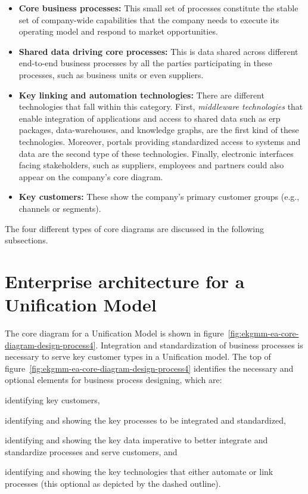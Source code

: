 \begin{itemize}
    \item \textbf{Core business processes:} This small set of processes constitute the stable set of company-wide
    capabilities that the company needs to execute its operating model and respond to market opportunities.
    \item \textbf{Shared data driving core processes:} This is data shared across different end-to-end
    business processes by all the parties participating in these processes, such as business units or even suppliers.
    \item \textbf{Key linking and automation technologies:} There are different technologies that fall within
    this category.
    First, \textit{middleware technologies} that enable integration of applications and access to shared data
    such as \gls{erp} packages, data-warehouses, and knowledge graphs, are the first kind of these technologies.
    Moreover, portals providing standardized access to systems and data are the second type of
    these technologies.
    Finally, electronic interfaces facing stakeholders, such as suppliers, employees and partners
    could also appear on the company’s core diagram.
    \item \textbf{Key customers:} These show the company's primary customer groups (e.g., channels or segments).
\end{itemize}

The four different types of core diagrams are discussed in the following subsections.

\section*{Enterprise architecture for a Unification Model}

The core diagram for a Unification Model is shown in figure~\ref{fig:ekgmm-ea-core-diagram-design-process4}.
Integration and standardization of business processes is necessary to serve key customer types in a Unification model.
The top of figure~\ref{fig:ekgmm-ea-core-diagram-design-process4} identifies the necessary and optional elements
for business process designing, which are:
\begin {enumerate*}
\item identifying key customers,
\item identifying and showing the key processes to be integrated and standardized,
\item identifying and showing the key data imperative to better integrate and standardize processes and serve customers, and
\item identifying and showing the key technologies that either automate or link processes (this optional as depicted
by the dashed outline).
\end{enumerate*}

